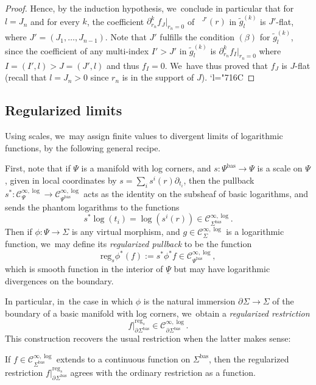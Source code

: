 \documentclass[JEP,XML,SOM,Unicode,NoFloatCountersInSection,published]{cedram}
\newcommand{\Changelback}{\mathcode`l="716C}
\theoremstyle{definition}
\theoremstyle{remark}
\let\defn\emph
\newcommand{\ulog}{\mathop{\widetilde{\log}}\nolimits}
\newcommand{\ug}{\widetilde{g}}
\newcommand{\Cinflog}[1]{\mathscr{C}^{\infty,\log}_{#1}}
\newcommand{\cvf}[1]{\partial_{#1}}
\newcommand{\reg}[1][]{\mathrm{reg}_{#1}}
\newcommand{\Sig}{\Sigma}
\newcommand{\uPsi}{\underline{\Psi}}
\newcommand{\bas}[1]{{#1}^{\mathrm{bas}}}
\newcommand{\Sigbas}{\bas{\Sig}}
\newcommand{\bdSig}[1][]{\partial^{#1}\Sigma}
\newcommand{\bdSigbas}[1][]{\partial^{#1}\Sigbas}
\newcommand{\Psibas}{\bas{\Psi}}
\begin{document}
\begin{proof}
Hence, by the induction hypothesis, we~conclude in particular that for $l=J_n$ and for every $k$, the coefficient $\cvf{r_n}^k f_J|_{r_n=0}$ of $\ulog{}\!^{J'}(r)$ in $\ug_l^{(k)}$ is $J'$-flat, where $J'=(J_1,\ldots,J_{n-1})$. Note that $J'$ fulfills the condition $(\beta)$ for $\ug_l^{(k)}$, since the coefficient of any multi-index $I'>J'$ in $\ug_l^{(k)}$ is $\cvf{r_n}^k f_I|_{r_n=0}$ where $I=(I',l)>J=(J',l)$ and thus $f_I=0$. We~have thus proved that $f_J$ is $J$-flat (recall that $l=J_n>0$ since $r_n$ is in the support of $J$).
\Changelback
\end{proof}

\subsection{Regularized limits} Using scales, we~may assign finite values to divergent limits of logarithmic functions, by the following general recipe.

First, note that if $\Psi$ is a manifold with log corners, and $s : \Psibas \to \Psi$ is a scale on $\Psi$, given in local coordinates by $s = \sum_i s^i(r)\cvf{t_i}$, then the pullback $s^* : \Cinflog{\Psi} \to \Cinflog{\Psibas}$ acts as the identity on the subsheaf of basic logarithms, and sends the phantom logarithms to the functions\vspace*{-3pt}
\[
s^*\log(t_i) = \log(s^i(r)) \in \Cinflog{\Sigbas}.
\]
Then if $\phi : \Psi \to \Sig$ is any virtual morphism, and $g \in \Cinflog{\Sig}$ is a logarithmic function, we~may define its \defn{regularized pullback} to be the function\vspace*{-3pt}
\[
\reg[s] \phi^*(f) := s^*\phi^*f \in \Cinflog{\Psibas},
\]
which is smooth function in the interior of $\uPsi$ but may have logarithmic divergences on the boundary.

In particular, in~the case in which $\phi$ is the natural immersion $\bdSig \to \Sig$ of the boundary of a basic manifold with log corners, we~obtain a \defn{regularized restriction}\vspace*{-3pt}
\[
f|_{\bdSigbas}^{\reg[s]} \in \Cinflog{\bdSigbas}.
\]
This construction recovers the usual restriction when the latter makes sense:

\begin{lemma}\label{lem:continuous-restriction}
If $f \in \Cinflog{\Sigbas}$ extends to a continuous function on $\Sigbas$, then the regularized restriction $f|_{\bdSigbas}^{\reg[s]}$ agrees with the ordinary restriction as a function.
\end{lemma}
\end{document}
